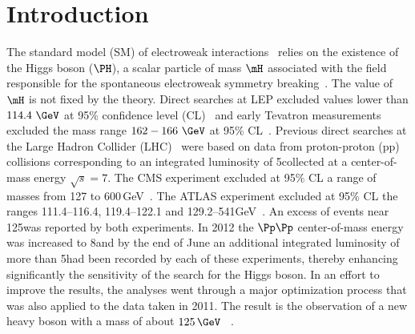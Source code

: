 

\section{Introduction}
\label{sec:introduction}

The standard model (SM) of electroweak
interactions~\cite{StandardModel67_1,StandardModel67_2,StandardModel67_3}
relies on the existence of the Higgs boson ($\PH$), a scalar particle
of mass $\mH$ associated with the field responsible for the
spontaneous electroweak symmetry
breaking~\cite{Englert:1964et,Higgs:1964ia,Higgs:1964pj,Guralnik:1964eu,Higgs:1966ev,Kibble:1967sv}.
The value of $\mH$ is not fixed by the theory.
Direct searches at LEP excluded values lower
than $114.4~\GeV$ at 95\% confidence level (CL)~\cite{Barate:2003sz} and early Tevatron measurements
excluded the mass range $162-166~\GeV$ at 95\% CL~\cite{TEVHIGGS_2010}.
Previous direct searches at the Large Hadron Collider (LHC)~\cite{Evans:2008zzb} 
were based on data from 
proton-proton (pp) collisions corresponding to 
an integrated luminosity of 5\fbinv collected at a center-of-mass
energy $\sqrt{s}=7$\TeV.
The CMS experiment excluded 
at 95\% CL a range of masses from 127 to 600\,GeV~\cite{Chatrchyan:2012tx}.
The ATLAS experiment excluded at 95\% CL the ranges 111.4--116.4,
119.4--122.1 and 129.2--541\unit{GeV}~\cite{ATLAS:2012ae, atlas:20127tev}.
An excess of events near 
125\GeV was reported by both experiments. 
In 2012 the $\Pp\Pp$ center-of-mass energy was increased to 8\TeV and by the end of June
an additional integrated luminosity of more than 5\fbinv had been
recorded by each of these experiments, 
thereby enhancing significantly the sensitivity of the search for the Higgs boson.
In an effort to improve the results, the analyses went through a major
optimization process that was also applied to the data taken in 2011. 
The result is the observation of a new heavy boson with a mass of about $125 \,\GeV$ 
~\cite{CMSobservation125,ATLASobservation125}. 

